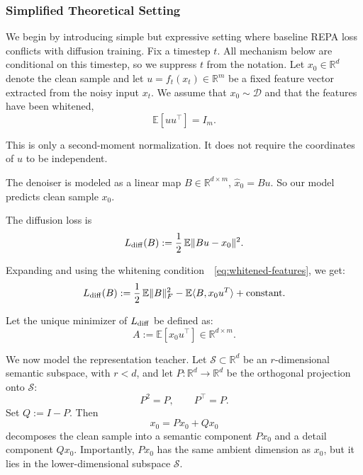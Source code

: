 \subsubsection{Simplified Theoretical Setting}

\newcommand{\gauss}{\mathcal{N}}

\newtheorem{theorem}{Theorem}
\newtheorem{assumption}{Assumption}
\newtheorem{remark}{Remark}

\label{sec:linear-repa-sigma}

We begin by introducing simple but expressive setting where baseline REPA
loss conflicts with diffusion training. Fix a timestep $t$. All mechanism below 
are conditional on this timestep, so we suppress $t$ from the notation. 
Let $x_0\in\mathbb R^d$ denote the clean sample and let $u = f_t(x_t)\in\mathbb R^m$
be a fixed feature vector extracted from the noisy input $x_t$. We assume that $x_0 \sim \mathcal{D}$
and that the features have been whitened,
\begin{equation}
    \mathbb E[uu^\top] = I_m .
    \label{eq:whitened-features}
\end{equation}

This is only a second-moment normalization. It does not require the coordinates
of $u$ to be independent. 

The denoiser is modeled as a linear map $B\in\mathbb R^{d\times m}$, $\widehat x_0 = Bu$. So our model predicts clean sample $x_0$.

The diffusion loss is
\begin{equation}
    L_{\rm diff}(B)
    :=
    \frac12\,\mathbb E\|Bu-x_0\|^2 .
    \label{eq:linear-diff-loss}
\end{equation}

Expanding and using the whitening condition~~\eqref{eq:whitened-features}, we get:
\begin{equation}
    L_{\rm diff}(B)
    :=
    \frac12\,\mathbb E\|B\|^2_F - \mathbb E \langle B, x_0u^T \rangle + \text{constant}.
    \label{eq:linear-diff-loss-expansion}
\end{equation}

Let the unique minimizer of $L_{\rm diff}$ be defined as:
\begin{equation}
    A := \mathbb E[x_0u^\top]\in\mathbb R^{d\times m} .
    \label{eq:A-def}
\end{equation}

We now model the representation teacher. Let $\mathcal S\subset\mathbb R^d$ be
an $r$-dimensional semantic subspace, with $r<d$, and let
$P:\mathbb R^d\to\mathbb R^d$ be the orthogonal projection onto $\mathcal S$:
\[
    P^2=P,
    \qquad
    P^\top=P .
\]
Set $Q:=I-P$. Then
\[
    x_0 = Px_0 + Qx_0
\]
decomposes the clean sample into a semantic component $Px_0$ and a detail
component $Qx_0$. Importantly, $Px_0$ has the same ambient dimension as $x_0$,
but it lies in the lower-dimensional subspace $\mathcal S$.

